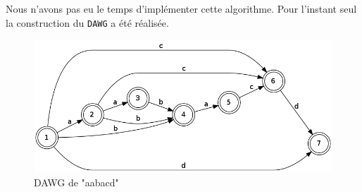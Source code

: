 \documentclass[a4paper,11pt]{article}
\begin{document}
Nous n'avons pas eu le temps d'implémenter cette algorithme. Pour l'instant seul la construction du \texttt{DAWG}\cite{DBLP:journals/tcs/BlumerBHECS85} a été réalisée.

\begin{figure}[h]
  \centering
  \includegraphics[width=15cm]{dawg.png}
  \caption{DAWG de "aabacd"}
  \label{fig:dawg}
\end{figure}

 
\end{document}

